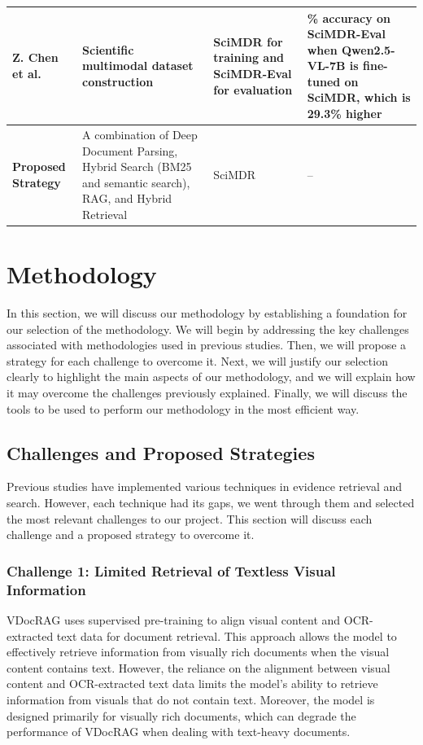 \documentclass[11pt,a4paper]{report}
\begin{document}
\begin{table}[h]
\begin{tabular}{|>{\raggedright\arraybackslash}p{}|>{\raggedright\arraybackslash}p{}|>{\raggedright\arraybackslash}p{}|>{\raggedright\arraybackslash}p{}|}
        \hline
        \textbf{Z. Chen et al.} &
        Scientific multimodal dataset construction &
        SciMDR for training and SciMDR-Eval for evaluation &
        49.1\% accuracy on SciMDR-Eval when Qwen2.5-VL-7B is fine-tuned on SciMDR, which is 29.3\% higher \\
        \hline
        \textbf{Proposed Strategy} &
        A combination of Deep Document Parsing, Hybrid Search (\ac{BM25} and semantic search), \ac{RAG}, and Hybrid Retrieval &
        SciMDR~\cite{Chen2026SciMDRAS} &
        -- \\
        \hline
    \end{tabular}
    \label{tab:Literature}
\end{table}

\cleardoublepage
\section{Methodology}
In this section, we will discuss our methodology by establishing a foundation for our selection of the methodology. We will begin by addressing the key challenges associated with methodologies used in previous studies. Then, we will propose a strategy for each challenge to overcome it. Next, we will justify our selection clearly to highlight the main aspects of our methodology, and we will explain how it may overcome the challenges previously explained. Finally, we will discuss the tools to be used to perform our methodology in the most efficient way.

\subsection{Challenges and Proposed Strategies}
Previous studies have implemented various techniques in evidence retrieval and search. However, each technique had its gaps, we went through them and selected the most relevant challenges to our project. This section will discuss each challenge and a proposed strategy to overcome it.

\subsubsection{Challenge 1: Limited Retrieval of Textless Visual Information}
VDocRAG \cite{Tanaka2025VDocRAGRG} uses supervised pre-training to align visual content and \ac{OCR}-extracted text data for document retrieval. This approach allows the model to effectively retrieve information from visually rich documents when the visual content contains text. However, the reliance on the alignment between visual content and \ac{OCR}-extracted text data limits the model’s ability to retrieve information from visuals that do not contain text. Moreover, the model is designed primarily for visually rich documents, which can degrade the performance of VDocRAG when dealing with text-heavy documents.\\
\end{document}
